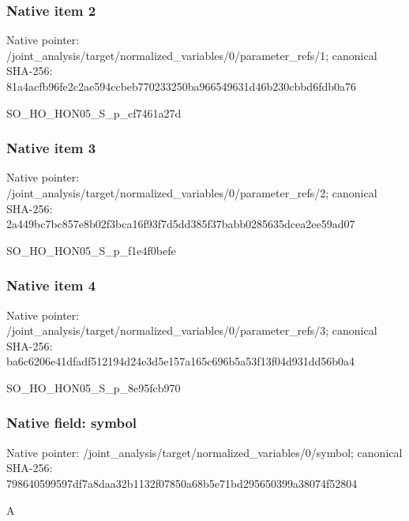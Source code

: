 \documentclass[10pt,a4paper]{article}
\begin{document}
\subsubsection{Native item 2}
Native pointer: /joint\_\allowbreak{}analysis/target/normalized\_\allowbreak{}variables/0/parameter\_\allowbreak{}refs/1; canonical SHA-256: 81a4acfb96fe2c2ae594ccbeb770233250ba966549631d46b230cbbd6fdb0a76

\begingroup\raggedright\sloppy SO\_\allowbreak{}HO\_\allowbreak{}HON05\_\allowbreak{}S\_\allowbreak{}p\_\allowbreak{}cf7461a27d\par\endgroup

\subsubsection{Native item 3}
Native pointer: /joint\_\allowbreak{}analysis/target/normalized\_\allowbreak{}variables/0/parameter\_\allowbreak{}refs/2; canonical SHA-256: 2a449bc7bc857e8b02f3bca16f93f7d5dd385f37babb0285635dcea2ee59ad07

\begingroup\raggedright\sloppy SO\_\allowbreak{}HO\_\allowbreak{}HON05\_\allowbreak{}S\_\allowbreak{}p\_\allowbreak{}f1e4f0befe\par\endgroup

\subsubsection{Native item 4}
Native pointer: /joint\_\allowbreak{}analysis/target/normalized\_\allowbreak{}variables/0/parameter\_\allowbreak{}refs/3; canonical SHA-256: ba6c6206e41dfadf512194d24e3d5e157a165c696b5a53f13f04d931dd56b0a4

\begingroup\raggedright\sloppy SO\_\allowbreak{}HO\_\allowbreak{}HON05\_\allowbreak{}S\_\allowbreak{}p\_\allowbreak{}8e95fcb970\par\endgroup

\subsubsection{Native field: symbol}
Native pointer: /joint\_\allowbreak{}analysis/target/normalized\_\allowbreak{}variables/0/symbol; canonical SHA-256: 798640599597df7a8daa32b1132f07850a68b5e71bd295650399a38074f52804

\begingroup\raggedright\sloppy A\par\endgroup
\end{document}
